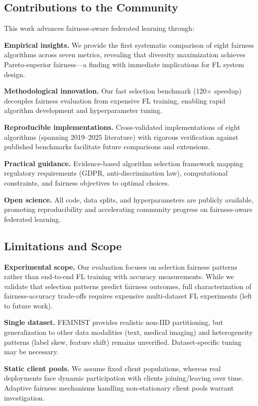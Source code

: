\documentclass{article}
\begin{document}
\subsection{Contributions to the Community}

This work advances fairness-aware federated learning through:

\textbf{Empirical insights.} We provide the first systematic comparison of eight fairness algorithms across seven metrics, revealing that diversity maximization achieves Pareto-superior fairness—a finding with immediate implications for FL system design.

\textbf{Methodological innovation.} Our fast selection benchmark (120$\times$ speedup) decouples fairness evaluation from expensive FL training, enabling rapid algorithm development and hyperparameter tuning.

\textbf{Reproducible implementations.} Cross-validated implementations of eight algorithms (spanning 2019--2025 literature) with rigorous verification against published benchmarks facilitate future comparisons and extensions.

\textbf{Practical guidance.} Evidence-based algorithm selection framework mapping regulatory requirements (GDPR, anti-discrimination law), computational constraints, and fairness objectives to optimal choices.

\textbf{Open science.} All code, data splits, and hyperparameters are publicly available, promoting reproducibility and accelerating community progress on fairness-aware federated learning.

\subsection{Limitations and Scope}

\textbf{Experimental scope.} Our evaluation focuses on selection fairness patterns rather than end-to-end FL training with accuracy measurements. While we validate that selection patterns predict fairness outcomes, full characterization of fairness-accuracy trade-offs requires expensive multi-dataset FL experiments (left to future work).

\textbf{Single dataset.} FEMNIST provides realistic non-IID partitioning, but generalization to other data modalities (text, medical imaging) and heterogeneity patterns (label skew, feature shift) remains unverified. Dataset-specific tuning may be necessary.

\textbf{Static client pools.} We assume fixed client populations, whereas real deployments face dynamic participation with clients joining/leaving over time. Adaptive fairness mechanisms handling non-stationary client pools warrant investigation.
\end{document}
